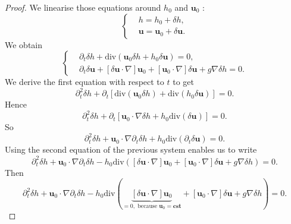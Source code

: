 \documentclass[a4paper, 11pt]{report}
\begin{document}
\begin{proof}
We linearise those equations around $h_0$ and $\boldsymbol{u}_0$ : 
\begin{equation*}
\left\{\begin{split}
&h=h_0+\delta h,\\
&\boldsymbol{u}=\boldsymbol{u}_0+\delta \boldsymbol{u}.
\end{split}\right.
\end{equation*}
We obtain
\begin{equation*}
\left\{
\begin{split}
&\partial_t\delta h+\text{div}\left(\boldsymbol{u}_0\delta h+h_0\delta \boldsymbol{u}\right)=0,\\
&\partial_t \delta \boldsymbol{u}+\left[\delta \boldsymbol{u}\cdot \nabla\right]\boldsymbol{u}_0+\left[\boldsymbol{u}_0\cdot \nabla\right]\delta \boldsymbol{u}+g\nabla\delta h=0.
\end{split}
\right.
\end{equation*}
We derive the first equation with respect to $t$ to get
\begin{equation*}
\partial_t^2\delta h+\partial_t\left[\text{div}\left(\boldsymbol{u}_0\delta h\right)+\text{div}\left(h_0\delta \boldsymbol{u}\right)\right]=0.
\end{equation*}
Hence
\begin{equation*}
\partial_t^2\delta h+\partial_t\left[\boldsymbol{u}_0\cdot \nabla \delta h+h_0\text{div}(\delta \boldsymbol{u})\right]=0.
\end{equation*}
So
\begin{equation*}
\partial_t^2\delta h+\boldsymbol{u}_0\cdot \nabla\partial_t\delta h+h_0\text{div}(\partial_t\delta \boldsymbol{u})=0.
\end{equation*}
Using the second equation of the previous system enables us to write
\begin{equation*}
\partial_t^2\delta h+\boldsymbol{u}_0\cdot \nabla\partial_t\delta h-h_0\text{div}\left(\left[\delta \boldsymbol{u}\cdot \nabla\right]\boldsymbol{u}_0+\left[\boldsymbol{u}_0\cdot \nabla\right]\delta \boldsymbol{u}+g\nabla \delta h\right)=0.
\end{equation*}
Then
\begin{equation*}
\partial_t^2\delta h+\boldsymbol{u}_0\cdot \nabla\partial_t\delta h-h_0\text{div}\left(\underbrace{\left[\delta \boldsymbol{u}\cdot \nabla\right]\boldsymbol{u}_0}_{=0,\text{\ because\ }\boldsymbol{u}_0=\boldsymbol{cst}}+\left[\boldsymbol{u}_0\cdot\nabla\right]\delta \boldsymbol{u}+g\nabla \delta h\right)=0.
\end{equation*}


\end{proof}
\end{document}
